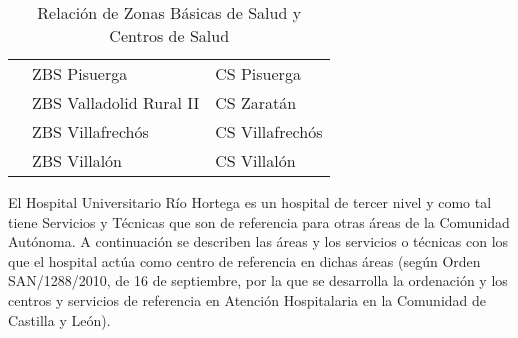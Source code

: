 \begin{table}[H]
\begin{tabular}{cll}
                                                     & ZBS Pisuerga            & CS Pisuerga                \\
                                                     & ZBS Valladolid Rural II & CS Zaratán                 \\
                                                     & ZBS Villafrechós        & CS Villafrechós            \\
                                                     & ZBS Villalón            & CS Villalón                \\
        \bottomrule
    \end{tabular}
    \caption{Relación de Zonas Básicas de Salud y Centros de Salud}
\end{table}

El Hospital Universitario Río Hortega es un hospital de tercer nivel y como tal tiene Servicios y
Técnicas que son de referencia para otras áreas de la Comunidad Autónoma. A continuación se
describen las áreas y los servicios o técnicas con los que el hospital actúa como centro de
referencia en dichas áreas (según Orden SAN/1288/2010, de 16 de septiembre, por la que se
desarrolla la ordenación y los centros y servicios de referencia en Atención Hospitalaria en la
Comunidad de Castilla y León).

